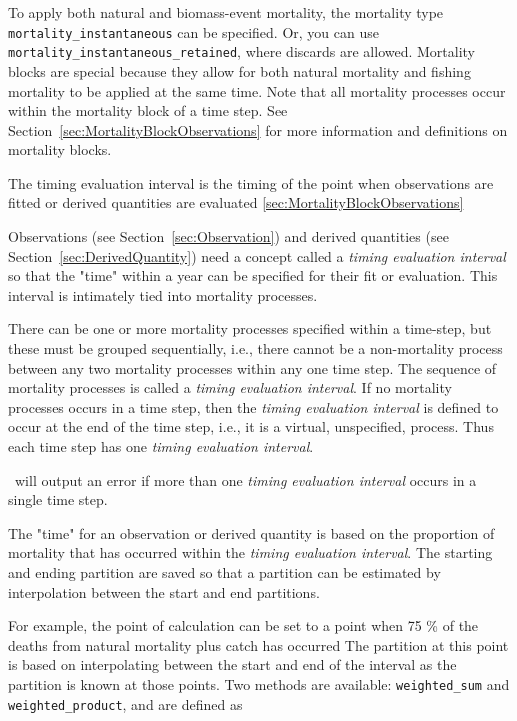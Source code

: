 To apply both natural and biomass-event mortality, the mortality type \texttt{mortality\_instantaneous} can be specified. Or, you can use \texttt{mortality\_instantaneous\_retained}, where discards are allowed. Mortality blocks are special because they allow for both natural mortality and fishing mortality to be applied at the same time. Note that all mortality processes occur within the mortality block of a time step. See Section~\ref{sec:MortalityBlockObservations} for more information and definitions on mortality blocks.

\textbf{}

The timing evaluation interval is the timing of the point when observations are fitted or derived quantities are evaluated \ref{sec:MortalityBlockObservations}\label{sec:TimingEvaluationInterval}

Observations (see Section~\ref{sec:Observation})  and derived quantities (see Section~\ref{sec:DerivedQuantity}) need a concept called a \emph{timing evaluation interval} so that the "time" within a year can be specified for their fit or evaluation. This interval is intimately tied into mortality processes.

There can be one or more mortality processes specified within a time-step, but these must be grouped sequentially, i.e., there cannot be a non-mortality process between any two mortality processes within any one time step. The sequence of mortality processes is called a \emph{timing evaluation interval}. If no mortality processes occurs in a time step, then the \emph{timing evaluation interval} is defined to occur at the end of the time step, i.e., it is a virtual, unspecified,  process. Thus  each time step has one \emph{timing evaluation interval}.

\CNAME\ will output an error if more than one \textit{timing evaluation interval} occurs in a single time step.

The "time" for an observation or derived quantity is based on the proportion of mortality that has occurred within the \textit{timing evaluation interval}. The starting and ending partition are saved so that a partition can be estimated by  interpolation between the start and end partitions.

For example, the point of calculation can be set to a point  when 75 \% of the deaths from natural mortality plus catch has occurred The partition at this point is based on interpolating between the start and end of the interval as the partition is known at those points.  Two  methods are available: \texttt{weighted\_sum} and \texttt{weighted\_product}, and are defined as

